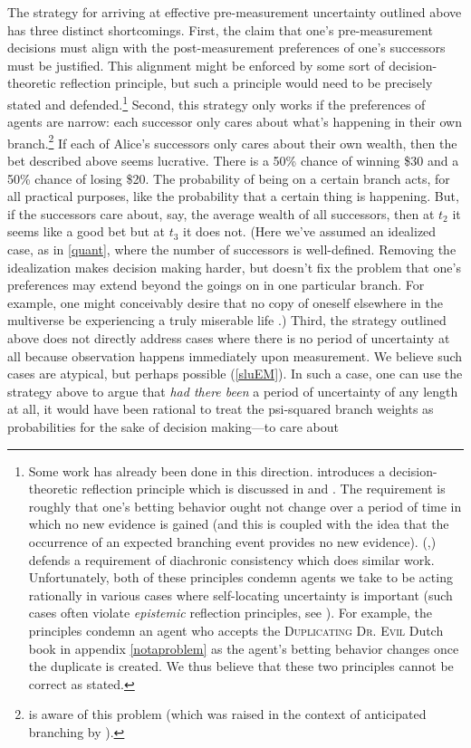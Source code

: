 \documentclass[onecolumn,secnumarabic,amsmath,amssymb,balancelastpage,nofootinbib]{article}
\begin{document}
The strategy for arriving at effective pre-measurement uncertainty outlined above has three distinct shortcomings.  First, the claim that one's pre-measurement decisions must align with the post-measurement preferences of one's successors must be justified.  This alignment might be enforced by some sort of decision-theoretic reflection principle, but such a principle would need to be precisely stated and defended.\footnote{Some work has already been done in this direction.  \citet[]{wallace2002} introduces a decision-theoretic reflection principle which is discussed in \citet[]{greaves2004} and \citet[.1]{greaves2007b}.  The requirement is roughly that one's betting behavior ought not change over a period of time in which no new evidence is gained (and this is coupled with the idea that the occurrence of an expected branching event provides no new evidence).  \citeauthor{wallace2010b} (\citeyear{wallace2010b},\citeyear{wallace2012}) defends a requirement of diachronic consistency which does similar work.  Unfortunately, both of these principles condemn agents we take to be acting rationally in various cases where self-locating uncertainty is important (such cases often violate \emph{epistemic} reflection principles, see \citealp{lewis2009, arntzenius2003}).  For example, the principles condemn an agent who accepts the \textsc{Duplicating Dr. Evil} Dutch book in appendix \ref{notaproblem} as the agent's betting behavior changes once the duplicate is created.  We thus believe that these two principles cannot be correct as stated.}  Second, this strategy only works if the preferences of agents are narrow: each successor only cares about what's happening in their own branch.\footnote{\citet{tappenden2011} is aware of this problem (which was raised in the context of anticipated branching by \citealp{price2010}).}  If each of Alice's successors only cares about their own wealth, then the bet described above seems lucrative.  There is a 50\% chance of winning \$30 and a 50\% chance of losing \$20.  The probability of being on a certain branch acts, for all practical purposes, like the probability that a certain thing is happening.  But, if the successors care about, say, the average wealth of all successors, then at $t_2$ it seems like a good bet but at $t_3$ it does not.  (Here we've assumed an idealized case, as in \textsection \ref{quant}, where the number of successors is well-defined.  Removing the idealization makes decision making harder, but doesn't fix the problem that one's preferences may extend beyond the goings on in one particular branch.  For example, one might conceivably desire that no copy of oneself elsewhere in the multiverse be experiencing a truly miserable life \citep[]{price2010}.)  Third, the strategy outlined above does not directly address cases where there is no period of uncertainty at all because observation happens immediately upon measurement. We believe such cases are atypical, but perhaps possible (\textsection \ref{sluEM}).  In such a case, one can use the strategy above to argue that \emph{had there been} a period of uncertainty of any length at all, it would have been rational to treat the psi-squared branch weights as probabilities for the sake of decision making---to care about 
\end{document}
